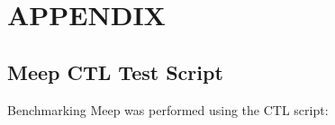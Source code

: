 
\chapter{APPENDIX} \label{ch:table appendix}





\section{Meep CTL Test Script}

Benchmarking Meep was performed using the CTL script:
